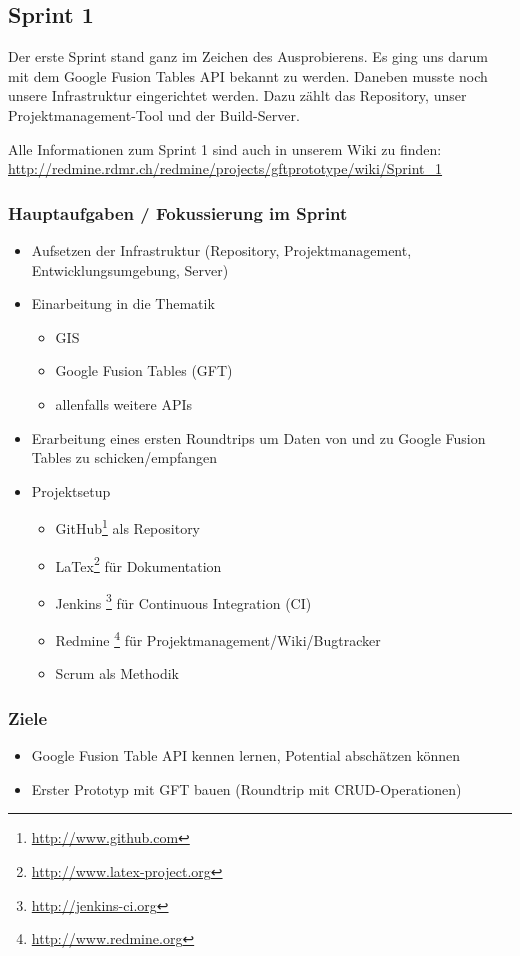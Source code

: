 \subsection{Sprint 1}

Der erste Sprint stand ganz im Zeichen des Ausprobierens. Es ging uns darum mit dem Google Fusion Tables API bekannt zu werden. Daneben musste noch unsere Infrastruktur eingerichtet werden. Dazu zählt das Repository, unser Projektmanagement-Tool und der Build-Server.

Alle Informationen zum Sprint 1 sind auch in unserem Wiki zu finden:
\url{http://redmine.rdmr.ch/redmine/projects/gftprototype/wiki/Sprint_1}

\subsubsection{Hauptaufgaben / Fokussierung im Sprint}

\begin{itemize}
	\item Aufsetzen der Infrastruktur (Repository, Projektmanagement, Entwicklungsumgebung, Server)
	\item Einarbeitung in die Thematik
	\begin{itemize}
		\item GIS
		\item Google Fusion Tables (GFT)
		\item allenfalls weitere APIs
	\end{itemize}
	\item Erarbeitung eines ersten Roundtrips um Daten von und zu Google Fusion Tables zu schicken/empfangen
	\item Projektsetup
	\begin{itemize}
		\item GitHub\footnote{\url{http://www.github.com}} als Repository
		\item LaTex\footnote{\url{http://www.latex-project.org}} für Dokumentation
		\item Jenkins \footnote{\url{http://jenkins-ci.org}} für Continuous Integration (CI)
		\item Redmine \footnote{\url{http://www.redmine.org}} für Projektmanagement/Wiki/Bugtracker
		\item Scrum als Methodik
	\end{itemize}
\end{itemize}

\subsubsection{Ziele}
\begin{itemize}
	\item Google Fusion Table API kennen lernen, Potential abschätzen können
	\item Erster Prototyp mit GFT bauen (Roundtrip mit CRUD-Operationen)
\end{itemize}

